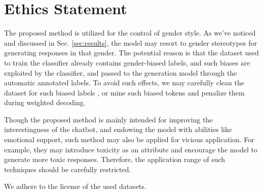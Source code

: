 \section*{Ethics Statement}
The proposed method is utilized for the control of gender style. As we've noticed and discussed in Sec. \ref{sec:results}, the model may resort to gender stereotypes for generating responses in that gender. The potential reason is that the dataset used to train the classifier already contains gender-biased labels, and such biases are exploited by the classifier, and passed to the generation model through the automatic annotated labels. To avoid such effects, we may carefully clean the dataset for such biased labels \cite{gehman2020realtoxicityprompts}, or mine such biased tokens and penalize them during weighted decoding. 

Though the proposed method is mainly intended for improving the interestingness of the chatbot, and endowing the model with abilities like emotional support, such method may also be applied for vicious application. For example, they may introduce toxicity as an attribute and encourage the model to generate more toxic responses. Therefore, the application range of such techniques should be carefully restricted. 

We adhere to the license of the used datasets.